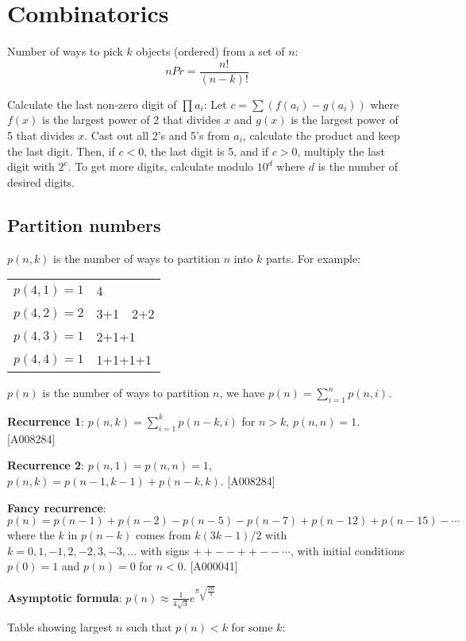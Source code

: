 \documentclass[a4paper,11pt]{article}
\begin{document}
\section{Combinatorics}

Number of ways to pick $k$ objects (ordered) from a set of $n$: $$n P r = \frac{n!}{(n-k)!}$$

Calculate the last non-zero digit of $\prod a_i$: Let $c=\sum (f(a_i)-g(a_i))$ where $f(x)$ is the largest power of 2 that divides $x$ and $g(x)$ is the largest power of 5 that divides $x$. Cast out all 2's and 5's from $a_i$, calculate the product and keep the last digit. Then, if $c<0$, the last digit is 5, and if $c>0$, multiply the last digit with $2^c$. To get more digits, calculate modulo $10^d$ where $d$ is the number of desired digits.

\subsection{Partition numbers}

$p(n,k)$ is the number of ways to partition $n$ into $k$ parts. For example:

\begin{tabular}{|l|l|}
\hline
	$p(4,1)=1$ & 4  \\
	$p(4,2)=2$ & 3+1 \,\, 2+2 \\
	$p(4,3)=1$ & 2+1+1  \\
	$p(4,4)=1$ & 1+1+1+1  \\
\hline
\end{tabular}

$p(n)$ is the number of ways to partition $n$, we have $p(n)=\sum_{i=1}^n p(n,i)$.

{\bf Recurrence 1}: $p(n,k)=\sum_{i=1}^k p(n-k,i)$ for $n>k$, $p(n,n)=1$. [A008284]

{\bf Recurrence 2}: $p(n,1)=p(n,n)=1$, $p(n,k)=p(n-1,k-1)+p(n-k,k)$. [A008284]

{\bf Fancy recurrence}: $p(n)=p(n-1)+p(n-2)-p(n-5)-p(n-7)+p(n-12)+p(n-15)- \cdots$ where the $k$ in $p(n-k)$ comes from $k(3k-1)/2$ with $k=0, 1, -1, 2, -2, 3, -3, \ldots$ with signs $+ + - - + + - - \cdots$, with initial conditions $p(0)=1$ and $p(n)=0$ for $n<0$. [A000041]

{\bf Asymptotic formula}: $p(n)\approx \frac{1}{4\sqrt{3}}e^{\pi \sqrt{\frac{2n}{3}}}$

Table showing largest $n$ such that $p(n)< k$ for some $k$:
\end{document}
